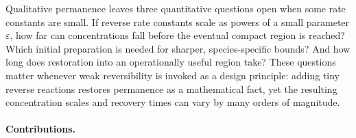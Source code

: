\documentclass[11pt,a4paper]{article}
\theoremstyle{plain}
\theoremstyle{definition}
\theoremstyle{remark}
\newcommand{\eps}{\varepsilon}
\begin{document}
Qualitative permanence leaves three quantitative questions open when some rate constants are small. If reverse rate constants scale as powers of a small parameter $\eps$, how far can concentrations fall before the eventual compact region is reached? Which initial preparation is needed for sharper, species-specific bounds? And how long does restoration into an operationally useful region take? These questions matter whenever weak reversibility is invoked as a design principle: adding tiny reverse reactions restores permanence as a mathematical fact, yet the resulting concentration scales and recovery times can vary by many orders of magnitude.

\paragraph{Contributions.}
\end{document}

